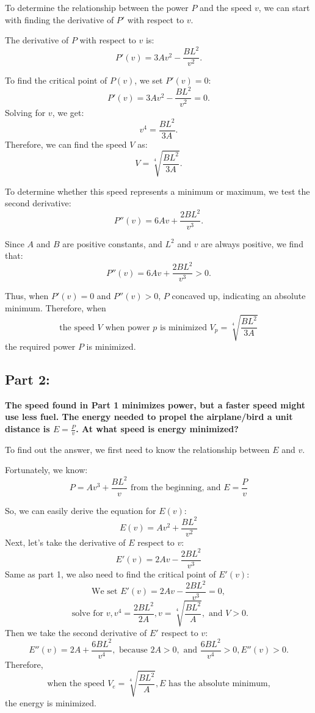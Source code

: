 \documentclass{article}
\begin{document}
To determine the relationship between the power \(P\) and the speed \(v\), we can start with finding the derivative of \(P'\) with respect to \(v\).

The derivative of \( P \) with respect to \( v \) is:
\[
P'(v) = 3Av^2 - \frac{BL^2}{v^2}.
\]

To find the critical point of \( P(v) \), we set \( P'(v) = 0 \):
\[
P'(v) = 3Av^2 - \frac{BL^2}{v^2} = 0.
\]
Solving for \( v \), we get:
\[
v^4 = \frac{BL^2}{3A}.
\]
Therefore, we can find the speed \( V \) as:
\[
V = \sqrt[4]{\frac{BL^2}{3A}}.
\]

To determine whether this speed represents a minimum or maximum, we test the second derivative:
\[
P''(v) = 6Av + \frac{2BL^2}{v^3}.
\]

Since \( A \) and \( B \) are positive constants, and \( L^2 \) and \( v \) are always positive, we find that:
\[
P''(v) = 6Av + \frac{2BL^2}{v^3} > 0.
\]

Thus, when \( P'(v) = 0 \) and \( P''(v) > 0 \), \( P \) concaved up, indicating an absolute minimum. Therefore, when
\[
\text{the speed } V \text{ when power } p \text{ is minimized }  V_p = \sqrt[4]{\frac{BL^2}{3A}}
\]
the required power \( P \) is minimized.

\subsection*{Part 2:}
{\large \bfseries The speed found in Part 1 minimizes power, but a faster speed might use less fuel. The energy needed to propel the airplane/bird a unit distance is \( E = \frac{P}{v} \). At what speed is energy minimized?}

To find out the answer, we first need to know the relationship between \( E \) and \( v \). 

Fortunately, we know:
\[
P = Av^3 + \frac{BL^2}{v} \text{ from the beginning, and }
E = \frac{P}{v}
\]

So, we can easily derive the equation for \( E(v) \):
\[
E(v) = Av^2 + \frac{BL^2}{v^2}
\]
Next, let's take the derivative of \(E\) respect to \(v\):
\[
E'(v) = 2Av-\frac{2BL^2}{v^3}
\]
Same as part 1, we also need to find the critical point of \(E'(v)\):
\[\text{We set } E'(v) = 2Av-\frac{2BL^2}{v^3} = 0,\]
\[\text{ solve for }v, v^4=\frac{2BL^2}{2A}, v = \sqrt[4]{\frac{BL^2}{A}},\text{ and }V > 0.\]
Then we take the second derivative of \(E'\) respect to \(v\):
\[E''(v) = 2A + \frac{6BL^2}{v^4},
\text{ because } 2A > 0, \text{ and } \frac{6BL^2}{v^4} > 0, E''(v) > 0.\]
Therefore,
 \[\text{when the speed }V_e = \sqrt[4]{\frac{BL^2}{A}}, E\text{ has the absolute minimum,}\]
  the energy is minimized.
\end{document}
